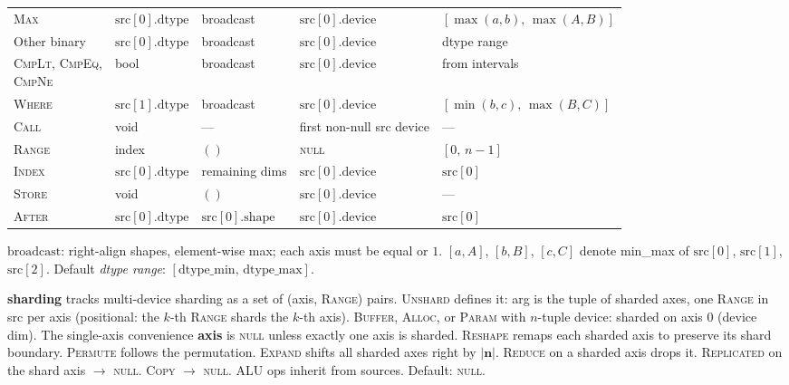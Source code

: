 \documentclass[10pt,letterpaper]{article}
\newcommand{\op}[1]{\textsc{#1}}
\begin{document}
\begin{tabular}{@{}l l l l l@{}}
\op{Max} & $\mathrm{src}[0].\mathrm{dtype}$ & broadcast & $\mathrm{src}[0].\mathrm{device}$ & $[\max(a,b),\, \max(A,B)]$ \\
Other binary & $\mathrm{src}[0].\mathrm{dtype}$ & broadcast & $\mathrm{src}[0].\mathrm{device}$ & dtype range \\
\shortstack[l]{\op{CmpLt}, \op{CmpEq},\\\op{CmpNe}} & bool & broadcast & $\mathrm{src}[0].\mathrm{device}$ & from intervals \\
\op{Where} & $\mathrm{src}[1].\mathrm{dtype}$ & broadcast & $\mathrm{src}[0].\mathrm{device}$ & $[\min(b,c),\, \max(B,C)]$ \\[3pt]
\op{Call} & void & --- & first non-null src device & --- \\
\op{Range} & index & $()$ & \textsc{null} & $[0,\, n{-}1]$ \\
\op{Index} & $\mathrm{src}[0].\mathrm{dtype}$ & remaining dims & $\mathrm{src}[0].\mathrm{device}$ & $\mathrm{src}[0]$ \\
\op{Store} & void & $()$ & $\mathrm{src}[0].\mathrm{device}$ & --- \\
\op{After} & $\mathrm{src}[0].\mathrm{dtype}$ & $\mathrm{src}[0].\mathrm{shape}$ & $\mathrm{src}[0].\mathrm{device}$ & $\mathrm{src}[0]$ \\
\bottomrule
\end{tabular}

\smallskip
$\mathrm{broadcast}$: right-align shapes, element-wise max; each axis must be equal or $1$.
$[a,A]$, $[b,B]$, $[c,C]$ denote min\_max of $\mathrm{src}[0]$, $\mathrm{src}[1]$, $\mathrm{src}[2]$.
Default \emph{dtype range}: $[\mathrm{dtype\_min},\, \mathrm{dtype\_max}]$.

\medskip
\textbf{sharding} tracks multi-device sharding as a set of (axis, \op{Range}) pairs. \op{Unshard} defines it: arg is the tuple of sharded axes, one \op{Range} in src per axis (positional: the $k$-th \op{Range} shards the $k$-th axis). \op{Buffer}, \op{Alloc}, or \op{Param} with $n$-tuple device: sharded on axis $0$ (device dim). The single-axis convenience \textbf{axis} is \textsc{null} unless exactly one axis is sharded.
\op{Reshape} remaps each sharded axis to preserve its shard boundary. \op{Permute} follows the permutation. \op{Expand} shifts all sharded axes right by $|\mathbf{n}|$.
\op{Reduce} on a sharded axis drops it. \op{Replicated} on the shard axis $\to$ \textsc{null}. \op{Copy} $\to$ \textsc{null}. ALU ops inherit from sources. Default: \textsc{null}.
\end{document}

